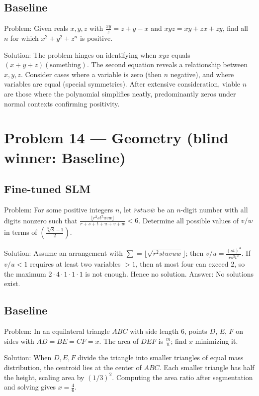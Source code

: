 \documentclass[11pt]{article}
\begin{document}
\subsection*{Baseline}

Problem:
Given reals $x,y,z$ with $\frac{xy}{z} = z + y - x$ and $xyz = xy + zx + zy$, find all $n$ for which $x^{2} + y^2 + z^n$ is positive.

Solution:
The problem hinges on identifying when $xyz$ equals $(x+y+z)(\text{something})$. The second equation reveals a relationship between $x,y,z$. Consider cases where a variable is zero (then $n$ negative), and where variables are equal (special symmetries). After extensive consideration, viable $n$ are those where the polynomial simplifies neatly, predominantly zeros under normal contexts confirming positivity.

\section*{Problem 14 --- Geometry \quad(blind winner: Baseline)}

\subsection*{Fine-tuned SLM}

Problem:
For some positive integers $n$, let $\overline{r} s t u v \overline{w}$ be an $n$-digit number with all digits nonzero such that $\frac{\lfloor r^{2} s t^{2} u v w\rfloor}{r+s+t+u+v+w}<6$. Determine all possible values of $v/w$ in terms of $(\frac{\sqrt[3]{8}-1}{2})$.

Solution:
Assume an arrangement with $\sum = \lfloor \sqrt{r^2 s t u v u w}\rfloor$; then $v/u = \frac{(st)^3}{rs^3t^3}$. If $v/u<1$ requires at least two variables $>1$, then at most four can exceed 2, so the maximum $2\cdot4\cdot1\cdot1\cdot1$ is not enough. Hence no solution. Answer: No solutions exist.

\subsection*{Baseline}

Problem:
In an equilateral triangle $ABC$ with side length 6, points $D$, $E$, $F$ on sides with $AD = BE = CF = x$. The area of $DEF$ is $\frac{m}{n}$; find $x$ minimizing it.

Solution:
When $D,E,F$ divide the triangle into smaller triangles of equal mass distribution, the centroid lies at the center of $ABC$. Each smaller triangle has half the height, scaling area by $(1/3)^2$. Computing the area ratio after segmentation and solving gives $\boxed{x = \frac{4}{6}}$.
\end{document}
